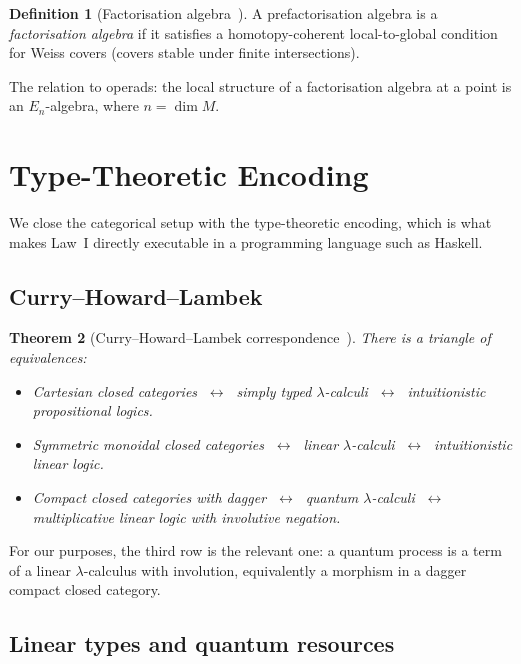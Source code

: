 \documentclass[12pt]{article}
\newtheorem{theorem}{Theorem}[section]
\theoremstyle{definition}
\newtheorem{definition}[theorem]{Definition}
\theoremstyle{remark}
\begin{document}
\begin{definition}[Factorisation algebra~\cite{costello2017}]
A prefactorisation algebra is a \emph{factorisation algebra} if it satisfies a homotopy-coherent local-to-global condition for Weiss covers (covers stable under finite intersections).
\end{definition}

The relation to operads: the local structure of a factorisation algebra at a point is an $E_n$-algebra, where $n = \dim M$.

\section{Type-Theoretic Encoding}
\label{sec:type-theory}

We close the categorical setup with the type-theoretic encoding, which is what makes Law~I directly executable in a programming language such as Haskell.

\subsection{Curry--Howard--Lambek}

\begin{theorem}[Curry--Howard--Lambek correspondence~\cite{lambekscott1986}]
\label{thm:chl}
There is a triangle of equivalences:
\begin{itemize}
\item Cartesian closed categories $\;\leftrightarrow\;$ simply typed $\lambda$-calculi $\;\leftrightarrow\;$ intuitionistic propositional logics.
\item Symmetric monoidal closed categories $\;\leftrightarrow\;$ linear $\lambda$-calculi $\;\leftrightarrow\;$ intuitionistic linear logic.
\item Compact closed categories with dagger $\;\leftrightarrow\;$ quantum $\lambda$-calculi $\;\leftrightarrow\;$ multiplicative linear logic with involutive negation.
\end{itemize}
\end{theorem}

For our purposes, the third row is the relevant one: a quantum process is a term of a linear $\lambda$-calculus with involution, equivalently a morphism in a dagger compact closed category.

\subsection{Linear types and quantum resources}
\end{document}
